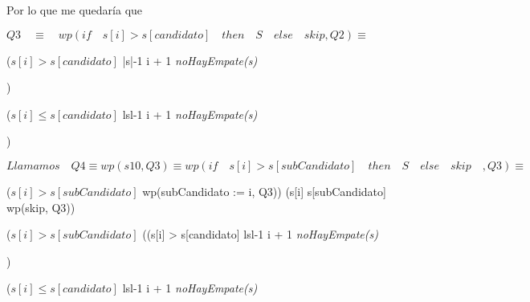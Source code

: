 \documentclass[10pt,a4paper]{article}
\begin{document}
{{{{ \vspace{5mm}

Por lo que me quedaría que

 \vspace{5mm}
 
$Q3 \quad \equiv \quad  wp(if \quad s[i] > s[candidato] \quad then \quad S \quad else \quad skip, Q2)
 \equiv$

($s[i] > s[candidato]$ \wedge |s|-1 \geq i + 1  \wedge  \textit{noHayEmpate(s)} \wedge


 \wedge 

) \lor

($s[i] \leq s[candidato]$ \wedge lsl-1 \geq i + 1  \wedge  \textit{noHayEmpate(s)} \wedge


 \wedge 

)

 \vspace{5mm}

$Llamamos \quad Q4 \equiv wp(s10, Q3) \equiv wp(if \quad s[i] > s[subCandidato] \quad then \quad S \quad else \quad skip \quad, Q3) \equiv$

($s[i] > s[subCandidato] $ \wedge wp(subCandidato := i, Q3)) \lor 
(s[i] \leq s[subCandidato]  \wedge wp(skip, Q3)) \equiv

 \vspace{5mm}

 ($s[i] > s[subCandidato]$ \wedge ((s[i] > s[candidato] \wedge lsl-1 \geq i + 1  \wedge  \textit{noHayEmpate(s)} \wedge


 \wedge 

) \lor

($s[i] \leq s[candidato]$ \wedge lsl-1 \geq i + 1  \wedge  \textit{noHayEmpate(s)} \wedge


 \wedge 

}}}}
\end{document}
